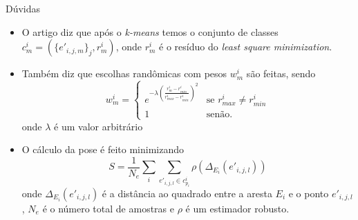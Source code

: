 \documentclass{beamer}
\begin{document}
\begin{frame}{Dúvidas}
    \begin{itemize}
        \item O artigo diz que após o \emph{k-means} temos o conjunto de classes $c^i_m = (\{e'_{i,j,m}\}_j, r^i_m)$, onde $r^i_m$ é o resíduo do \emph{least square minimization}.
        \item Também diz que escolhas randômicas com pesos $w^i_m$ são feitas, sendo
            \[
            w^i_m = \begin{cases}
                e^{-\lambda \left( \frac{r^i_m - r^i_{min}}{r^i_{max} - r^i_{min}}\right)^2 } & \mbox{se } r^i_{max} \neq r^i_{min} \\
                1 & \mbox{senão}.
            \end{cases}
            \]
            onde $\lambda$ é um valor arbitrário
        \item O cálculo da pose é feito minimizando
            \[
                S = \frac{1}{N_e} \sum_i \sum_{e'_{i,j,l} \in c^i_{p_i}} \rho (\Delta_{E_i}(e'_{i,j,l}))
            \]
            onde $\Delta_{E_i}(e'_{i,j,l})$ é a distância ao quadrado entre a aresta $E_i$ e o ponto $e'_{i,j,l}$, $N_e$ é o número total de amostras e $\rho$ é um estimador robusto.
    \end{itemize}
\end{frame}
\end{document}
